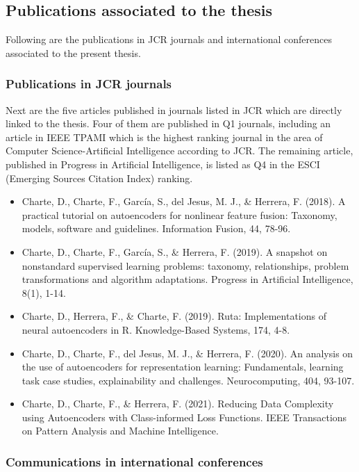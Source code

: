\subsection{Publications associated to the thesis}

Following are the publications in JCR journals and international conferences associated to the present thesis.

\subsubsection{Publications in JCR journals}

Next are the five articles published in journals listed in JCR which are directly linked to the thesis. Four of them are published in Q1 journals, including an article in IEEE TPAMI which is the highest ranking journal in the area of Computer Science-Artificial Intelligence according to JCR. The remaining article, published in Progress in Artificial Intelligence, is listed as Q4 in the ESCI (Emerging Sources Citation Index) ranking.

\begin{itemize}
    \item Charte, D., Charte, F., García, S., del Jesus, M. J., \& Herrera, F. (2018). A practical tutorial on autoencoders for nonlinear feature fusion: Taxonomy, models, software and guidelines. Information Fusion, 44, 78-96.
    \item Charte, D., Charte, F., García, S., \& Herrera, F. (2019). A snapshot on nonstandard supervised learning problems: taxonomy, relationships, problem transformations and algorithm adaptations. Progress in Artificial Intelligence, 8(1), 1-14.
    \item Charte, D., Herrera, F., \& Charte, F. (2019). Ruta: Implementations of neural autoencoders in R. Knowledge-Based Systems, 174, 4-8.
    \item Charte, D., Charte, F., del Jesus, M. J., \& Herrera, F. (2020). An analysis on the use of autoencoders for representation learning: Fundamentals, learning task case studies, explainability and challenges. Neurocomputing, 404, 93-107.
    \item Charte, D., Charte, F., \& Herrera, F. (2021). Reducing Data Complexity using Autoencoders with Class-informed Loss Functions. IEEE Transactions on Pattern Analysis and Machine Intelligence.
\end{itemize}

\subsubsection{Communications in international conferences}

